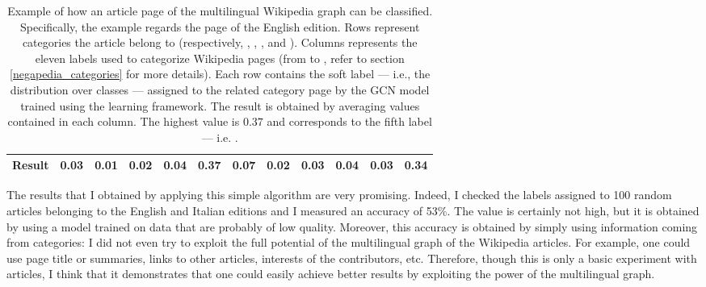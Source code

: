 \begin{table}[h]
\begin{tabular}{|c||l|l|l|l|l|l|l|l|l|l|l|}
                       Result     & 0.03                    & 0.01                    & 0.02                    & 0.04                    & \textbf{0.37}                    & 0.07                    & 0.02                    & 0.03                    & 0.04                    & 0.03                     & 0.34                     \\ \hline
\end{tabular}
\caption{Example of how an article page of the multilingual Wikipedia graph can be classified. Specifically, the example regards the  page of the English edition. Rows represent categories the article belong to (respectively, , , ,  and ). Columns represents the eleven labels used to categorize Wikipedia pages (from  to , refer to section \ref{negapedia_categories} for more details). Each row contains the soft label --- i.e., the distribution over classes --- assigned to the related category page by the GCN model trained using the learning framework. The result is obtained by averaging values contained in each column. The highest value is \(0.37\) and corresponds to the fifth label --- i.e. .}
\label{articles_example}
\end{table}

        The results that I obtained by applying this simple algorithm are very promising. Indeed, I checked the labels assigned to 100 random articles belonging to the English and Italian editions and I measured an accuracy of 53\%. The value is certainly not high, but it is obtained by using a model trained on data that are probably of low quality. Moreover, this accuracy is obtained by simply using information coming from categories: I did not even try to exploit the full potential of the multilingual graph of the Wikipedia articles. For example, one could use page title or summaries, links to other articles, interests of the contributors, etc. Therefore, though this is only a basic experiment with articles, I think that it demonstrates that one could easily achieve better results by exploiting the power of the multilingual graph.